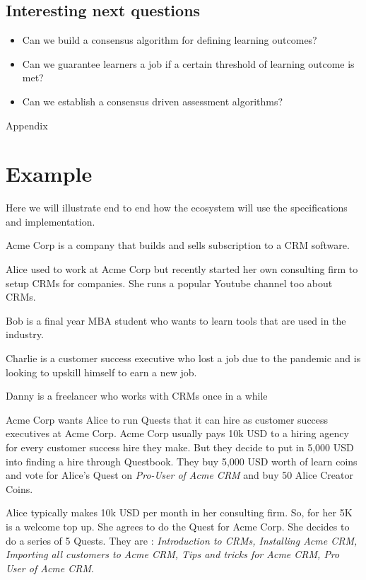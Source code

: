 \documentclass{article}
\begin{document}
    \subsection{Interesting next questions}
      \begin{itemize}
        \item Can we build a consensus algorithm for defining learning outcomes?
        \item Can we guarantee learners a job if a certain threshold of learning outcome is met?
        \item Can we establish a consensus driven assessment algorithms?
      \end{itemize}

  \pagebreak
  Appendix
  \pagebreak
  \appendix
  \section{Example}
    Here we will illustrate end to end how the ecosystem will use the specifications and implementation.
    \par
    Acme Corp is a company that builds and sells subscription to a CRM software.
    \par
    Alice used to work at Acme Corp but recently started her own consulting firm to setup CRMs for companies. She runs a popular Youtube channel too about CRMs.
    \par
    Bob is a final year MBA student who wants to learn tools that are used in the industry.
    \par
    Charlie is a customer success executive who lost a job due to the pandemic and is looking to upskill himself to earn a new job.
    \par
    Danny is a freelancer who works with CRMs once in a while
    \par
    Acme Corp wants Alice to run Quests that it can hire as customer success executives at Acme Corp.
    Acme Corp usually pays 10k USD to a hiring agency for every customer success hire they make. But they decide to put in 5,000 USD into finding a hire through Questbook. They buy 5,000 USD worth of learn coins and vote for Alice's Quest on \textit{Pro-User of Acme CRM} and buy 50 Alice Creator Coins.
    \par
    Alice typically makes 10k USD per month in her consulting firm. So, for her 5K is a welcome top up. She agrees to do the Quest for Acme Corp. She decides to do a series of 5 Quests.
    They are : \textit{Introduction to CRMs, Installing Acme CRM, Importing all customers to Acme CRM, Tips and tricks for Acme CRM, Pro User of Acme CRM}.
\end{document}
